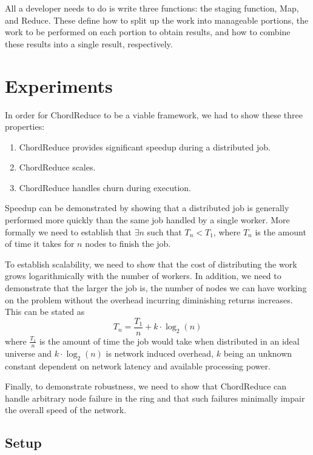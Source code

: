 All a developer needs to do is write three functions: the staging function, Map, and Reduce.  These define how to split up the work into manageable portions, the work to be performed on each portion to obtain results, and how to combine these results into a single result, respectively. 



\section{Experiments}
In order for ChordReduce to be a viable framework, we had to show these three properties:
\begin{enumerate}
	\item ChordReduce provides significant speedup during a distributed job.
	\item ChordReduce scales.
	\item ChordReduce handles churn during execution.
\end{enumerate}
Speedup can be demonstrated by showing that a distributed job is generally performed more quickly than the same job handled by a single worker.  More formally we need to establish that $\exists n$ such that $T_{n} < T_{1}$, where $T_{n}$ is the amount of time it takes for $n$ nodes to finish the job.

To establish scalability, we need to show that the cost of distributing the work grows logarithmically with the number of workers.  In addition, we need to demonstrate that the larger the job is, the number of nodes we can have working on the problem without the overhead incurring diminishing returns increases. This can be stated as $$T_{n} = \frac{T_{1}}{n} + k \cdot \log_{2}(n)$$ where $\frac{T_{1}}{n}$ is the amount of time the job would take when distributed in an ideal universe and $k \cdot \log_{2}(n)$ is network induced overhead, $k$ being an unknown constant dependent on network latency and available processing power.

Finally, to demonstrate robustness, we need to show that ChordReduce can handle arbitrary node failure in the ring and that such failures minimally impair the overall speed of the network.

\subsection{Setup}

